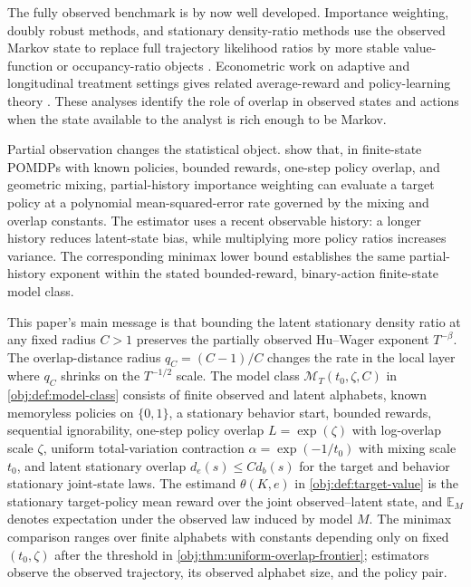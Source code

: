\documentclass[11pt]{article}
\begin{document}
The fully observed benchmark is by now well developed. Importance weighting, doubly robust methods, and stationary density-ratio methods use the observed Markov state to replace full trajectory likelihood ratios by more stable value-function or occupancy-ratio objects \citep{Precup2000,Jiang2016,Thomas2016,Liu2018,Nachum2019,Uehara2020,KallusUehara2020}. Econometric work on adaptive and longitudinal treatment settings gives related average-reward and policy-learning theory \citep{LiaoKlasnjaMurphy2021,Liao2022}. These analyses identify the role of overlap in observed states and actions when the state available to the analyst is rich enough to be Markov.

Partial observation changes the statistical object. \citet{HuWager2023} show that, in finite-state POMDPs with known policies, bounded rewards, one-step policy overlap, and geometric mixing, partial-history importance weighting can evaluate a target policy at a polynomial mean-squared-error rate governed by the mixing and overlap constants. The estimator uses a recent observable history: a longer history reduces latent-state bias, while multiplying more policy ratios increases variance. The corresponding minimax lower bound establishes the same partial-history exponent within the stated bounded-reward, binary-action finite-state model class.

This paper's main message is that bounding the latent stationary density ratio at any fixed radius \(C>1\) preserves the partially observed Hu--Wager exponent \(T^{-\beta}\). The overlap-distance radius \(q_C=(C-1)/C\) changes the rate in the local layer where \(q_C\) shrinks on the \(T^{-1/2}\) scale. The model class \(\mathcal M_T(t_0,\zeta,C)\) in \cref{obj:def:model-class} consists of finite observed and latent alphabets, known memoryless policies on \(\{0,1\}\), a stationary behavior start, bounded rewards, sequential ignorability, one-step policy overlap \(L=\exp(\zeta)\) with log-overlap scale \(\zeta\), uniform total-variation contraction \(\alpha=\exp(-1/t_0)\) with mixing scale \(t_0\), and latent stationary overlap \(d_e(s)\le C d_b(s)\) for the target and behavior stationary joint-state laws. The estimand \(\theta(K,e)\) in \cref{obj:def:target-value} is the stationary target-policy mean reward over the joint observed--latent state, and \(\mathbb E_M\) denotes expectation under the observed law induced by model \(M\). The minimax comparison ranges over finite alphabets with constants depending only on fixed \((t_0,\zeta)\) after the threshold in \cref{obj:thm:uniform-overlap-frontier}; estimators observe the observed trajectory, its observed alphabet size, and the policy pair.
\end{document}
